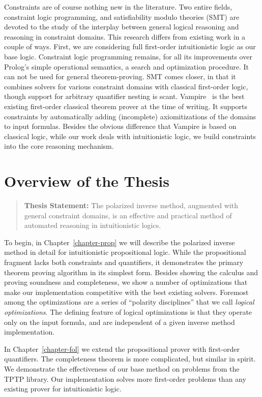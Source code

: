 Constraints are of course nothing new in the literature.  Two entire fields,
constraint logic programming, and satisfiability modulo theories (SMT) are
devoted to the study of the interplay between general logical reasoning and
reasoning in constraint domains.  This research differs from existing work in a
couple of ways.  First, we are considering full first-order intuitionistic logic
as our base logic.  Constraint logic programming remains, for all its
improvements over Prolog's simple operational semantics, a search and
optimization procedure.  It can not be used for general theorem-proving.  SMT
comes closer, in that it combines solvers for various constraint domains with
classical first-order logic, though support for arbitrary quantifier nesting is
scant.  Vampire~\cite{Riazanov.1999.Vampire} is the best existing first-order
classical theorem prover at the time of writing.  It supports constraints by
automatically adding (incomplete) axiomitizations of the domains to input
formulas.  Besides the obvious difference that Vampire is based on classical
logic, while our work deals with intuitionistic logic, we build constraints into
the core reasoning mechanism.

\section{Overview of the Thesis}

\begin{quote}
\textbf{Thesis Statement:} The polarized inverse method, augmented with
general constraint domains, is an effective and practical method of
automated reasoning in intuitionistic logics.
\end{quote}

To begin, in Chapter~\ref{chapter-prop} we will describe the polarized inverse
method in detail for intuitionistic propositional logic.  While the
propositional fragment lacks both constraints and quantifiers, it demonstrates
the primary theorem proving algorithm in its simplest form.  Besides showing the
calculus and proving soundness and completeness, we show a number of
optimizations that make our implementation competitive with the best existing
solvers.  Foremost among the optimizations are a series of ``polarity
disciplines'' that we call \emph{logical optimizations}.  The defining feature
of logical optimizations is that they operate only on the input formula, and are
independent of a given inverse method implementation.

In Chapter~\ref{chapter-fol} we extend the propositional prover with first-order
quantifiers.  The completeness theorem is more complicated, but similar in
spirit.  We demonstrate the effectiveness of our base method on problems from
the TPTP library.  Our implementation solves more first-order problems than any
existing prover for intuitionistic logic.


